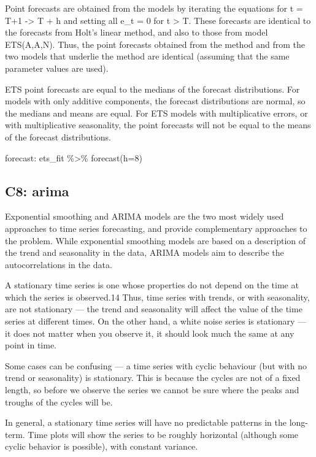 \documentclass[]{book}
\begin{document}
Point forecasts are obtained from the models by iterating the equations
for t = T+1 -\textgreater{} T + h and setting all e\_t = 0 for t
\textgreater{} T. These forecasts are identical to the forecasts from
Holt's linear method, and also to those from model ETS(A,A,N). Thus, the
point forecasts obtained from the method and from the two models that
underlie the method are identical (assuming that the same parameter
values are used).

ETS point forecasts are equal to the medians of the forecast
distributions. For models with only additive components, the forecast
distributions are normal, so the medians and means are equal. For ETS
models with multiplicative errors, or with multiplicative seasonality,
the point forecasts will not be equal to the means of the forecast
distributions.

forecast: ets\_fit \%\textgreater{}\% forecast(h=8)

\subsection{C8: arima}\label{c8-arima}

Exponential smoothing and ARIMA models are the two most widely used
approaches to time series forecasting, and provide complementary
approaches to the problem. While exponential smoothing models are based
on a description of the trend and seasonality in the data, ARIMA models
aim to describe the autocorrelations in the data.

A stationary time series is one whose properties do not depend on the
time at which the series is observed.14 Thus, time series with trends,
or with seasonality, are not stationary --- the trend and seasonality
will affect the value of the time series at different times. On the
other hand, a white noise series is stationary --- it does not matter
when you observe it, it should look much the same at any point in time.

Some cases can be confusing --- a time series with cyclic behaviour (but
with no trend or seasonality) is stationary. This is because the cycles
are not of a fixed length, so before we observe the series we cannot be
sure where the peaks and troughs of the cycles will be.

In general, a stationary time series will have no predictable patterns
in the long-term. Time plots will show the series to be roughly
horizontal (although some cyclic behavior is possible), with constant
variance.
\end{document}
